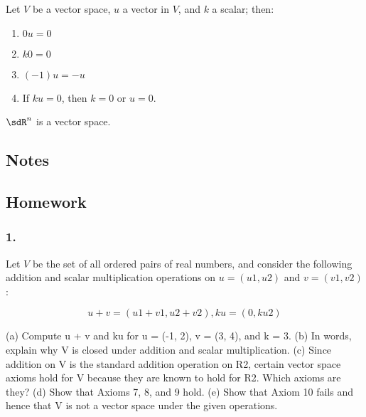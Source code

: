 \documentclass{report}
\begin{document}
\edefn

\bthm
Let $V$ be a vector space, $u$ a vector in $V$, and $k$ a scalar; then:
\begin{enumerate}
    \item $0u=0$ 
    \item $k0=0$ 
    \item $(-1)u=-u$ 
    \item If $ku=0$, then $k=0$ or $u=0$.
\end{enumerate}
\ethm

\bexa
$\sdR^{n}$ is a vector space.
\eexa

\pagebreak

\subsection{Notes}

\pagebreak

\subsection{Homework}


\subsubsection*{1.}
Let $V$ be the set of all ordered pairs of real numbers, and consider the following addition and scalar multiplication operations on $u = (u1, u2)$ and $v = (v1, v2)$:

\[
        u + v = (u1 + v1, u2 + v2), ku = (0, ku2)
\]

    (a) Compute u + v and ku for u = (-1, 2), v = (3, 4), and k = 3.
    (b) In words, explain why V is closed under addition and scalar multiplication.
    (c) Since addition on V is the standard addition operation on R2, certain vector space axioms hold for V because they are known to hold for R2. Which axioms are they?
    (d) Show that Axioms 7, 8, and 9 hold.
    (e) Show that Axiom 10 fails and hence that V is not a vector space under the given operations.
\end{document}
